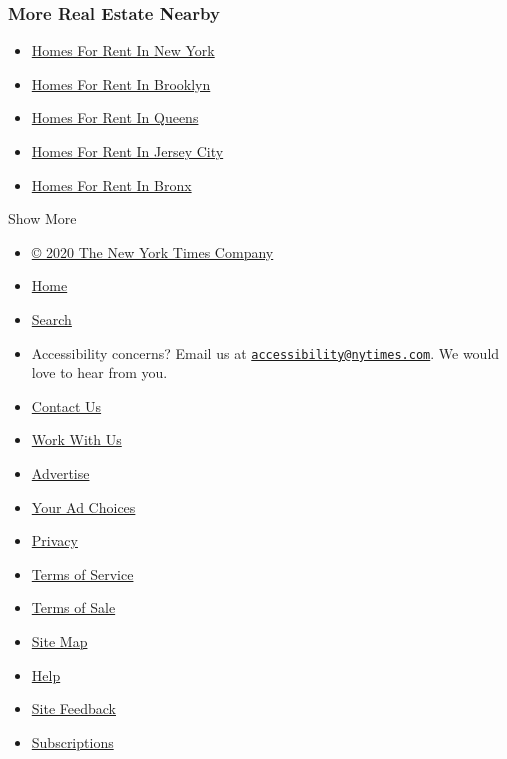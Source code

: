 \hypertarget{more-real-estate-nearby}{%
\subsubsection{More Real Estate Nearby}\label{more-real-estate-nearby}}

\begin{itemize}
\tightlist
\item
  \href{/real-estate/usa/ny/new-yorknew-york-ny-usa/homes-for-rent}{Homes
  For Rent In New York}
\item
  \href{/real-estate/usa/ny/brooklynbrooklyn-ny-usa/homes-for-rent}{Homes
  For Rent In Brooklyn}
\item
  \href{/real-estate/usa/ny/queensqueens-ny-usa/homes-for-rent}{Homes
  For Rent In Queens}
\item
  \href{/real-estate/usa/nj/jersey-cityjersey-city-nj-usa/homes-for-rent}{Homes
  For Rent In Jersey City}
\item
  \href{/real-estate/usa/ny/bronxbronx-ny-usa/homes-for-rent}{Homes For
  Rent In Bronx}
\end{itemize}

Show More

\begin{itemize}
\tightlist
\item
  \href{https://help.nytimes.com/hc/en-us/articles/115014792127-Copyright-notice}{©
  2020 The New York Times Company}
\item
  \href{https://www.nytimes.com}{Home}
\item
  \href{http://query.nytimes.com/search/sitesearch/\#/}{Search}
\item
  Accessibility concerns? Email us at
  \href{mailto:accessibility@nytimes.com}{\nolinkurl{accessibility@nytimes.com}}.
  We would love to hear from you.
\item
  \href{https://www.nytimes.com/ref/membercenter/help/infoservdirectory.html}{Contact
  Us}
\item
  \href{http://www.nytco.com/careers}{Work With Us}
\item
  \href{http://nytmediakit.com/}{Advertise}
\item
  \href{https://www.nytimes.com/content/help/rights/privacy/policy/privacy-policy.html\#pp}{Your
  Ad Choices}
\item
  \href{https://www.nytimes.com/privacy}{Privacy}
\item
  \href{https://help.nytimes.com/hc/en-us/articles/115014893428-Terms-of-service}{Terms
  of Service}
\item
  \href{https://help.nytimes.com/hc/en-us/articles/115014893968-Terms-of-sale}{Terms
  of Sale}
\item
  \href{http://spiderbites.nytimes.com}{Site Map}
\item
  \href{https://help.nytimes.com/hc/en-us}{Help}
\item
  \href{https://help.nytimes.com/hc/en-us/articles/115015385887-Contact-us}{Site
  Feedback}
\item
  \href{https://www.nytimes.com/subscriptions/Multiproduct/lp5558.html?campaignId=37WXW}{Subscriptions}
\end{itemize}

